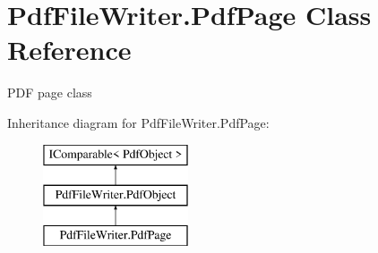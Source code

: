 \hypertarget{class_pdf_file_writer_1_1_pdf_page}{}\section{Pdf\+File\+Writer.\+Pdf\+Page Class Reference}
\label{class_pdf_file_writer_1_1_pdf_page}


P\+DF page class  


Inheritance diagram for Pdf\+File\+Writer.\+Pdf\+Page\+:\begin{figure}[H]
\begin{center}
\leavevmode
\includegraphics[height=3.000000cm]{class_pdf_file_writer_1_1_pdf_page}
\end{center}
\end{figure}
